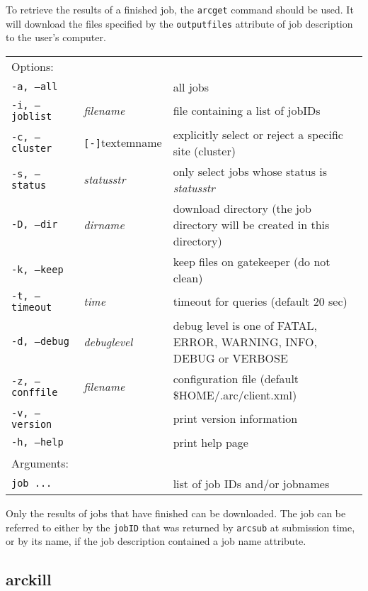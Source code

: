 To retrieve the results of a finished job, the \texttt{arcget}
 command should be used. It
will download the files specified by the \texttt{outputfiles}
attribute of job description to the user's computer.

\hspace*{0.5cm}
\begin{shaded}
\end{shaded}
\begin{longtable}{llp{8cm}}
   Options:&&\\
   \texttt{-a, --all}& & all jobs\\
   \texttt{-i, --joblist}& \textit{filename} & file containing a list of jobIDs\\
   \texttt{-c, --cluster}&\verb#[-]#textem{name}&explicitly select or reject a specific site (cluster)\\
   \texttt{-s, --status}& \textit{statusstr} &only select jobs whose status is \textit{statusstr}\\
   \texttt{-D, --dir} & \textit{dirname} & download directory (the job directory will be created in this directory)\\
   \texttt{-k, --keep}& & keep files on gatekeeper (do not clean)\\
   \texttt{-t, --timeout}& \textit{time} & timeout for queries (default 20 sec)\\
   \texttt{-d, --debug}& \textit{debuglevel}&debug level is one of  FATAL, ERROR, WARNING, INFO, DEBUG or VERBOSE\\
   \texttt{-z, --conffile}&\textit{filename}& configuration file (default {\$}HOME/.arc/client.xml)\\
   \texttt{-v, --version}& & print version information\\
   \texttt{-h, --help}& & print help page\\
   Arguments:&&\\
   \texttt{job ...} && list of job IDs and/or jobnames\\
\end{longtable}

Only the results of jobs that have finished can be downloaded. The job
can be referred to either by the \texttt{jobID} that was returned by
\texttt{arcsub} at submission time, or by its name, if the job
description contained a job name attribute.

\subsection{arckill}
\label{sec:arckill}

